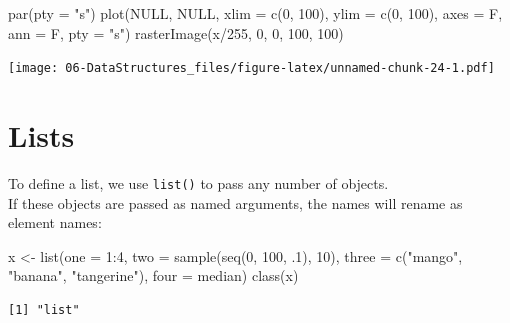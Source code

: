 \documentclass[
]{book}
\newenvironment{Shaded}{\begin{snugshade}}{\end{snugshade}}
\newcommand{\AttributeTok}[1]{\textcolor[rgb]{0.77,0.63,0.00}{#1}}
\newcommand{\ConstantTok}[1]{\textcolor[rgb]{0.00,0.00,0.00}{#1}}
\newcommand{\DecValTok}[1]{\textcolor[rgb]{0.00,0.00,0.81}{#1}}
\newcommand{\FunctionTok}[1]{\textcolor[rgb]{0.00,0.00,0.00}{#1}}
\newcommand{\NormalTok}[1]{#1}
\newcommand{\OtherTok}[1]{\textcolor[rgb]{0.56,0.35,0.01}{#1}}
\newcommand{\SpecialCharTok}[1]{\textcolor[rgb]{0.00,0.00,0.00}{#1}}
\newcommand{\StringTok}[1]{\textcolor[rgb]{0.31,0.60,0.02}{#1}}
\begin{document}
\begin{Shaded}
\begin{Highlighting}[]
\FunctionTok{par}\NormalTok{(}\AttributeTok{pty =} \StringTok{"s"}\NormalTok{)}
\FunctionTok{plot}\NormalTok{(}\ConstantTok{NULL}\NormalTok{, }\ConstantTok{NULL}\NormalTok{,}
     \AttributeTok{xlim =} \FunctionTok{c}\NormalTok{(}\DecValTok{0}\NormalTok{, }\DecValTok{100}\NormalTok{), }\AttributeTok{ylim =} \FunctionTok{c}\NormalTok{(}\DecValTok{0}\NormalTok{, }\DecValTok{100}\NormalTok{),}
     \AttributeTok{axes =}\NormalTok{ F, }\AttributeTok{ann =}\NormalTok{ F, }\AttributeTok{pty =} \StringTok{"s"}\NormalTok{)}
\FunctionTok{rasterImage}\NormalTok{(x}\SpecialCharTok{/}\DecValTok{255}\NormalTok{, }\DecValTok{0}\NormalTok{, }\DecValTok{0}\NormalTok{, }\DecValTok{100}\NormalTok{, }\DecValTok{100}\NormalTok{)}
\end{Highlighting}
\end{Shaded}

\texttt{[image: 06-DataStructures\_files/figure-latex/unnamed-chunk-24-1.pdf]}

\hypertarget{lists}{%
\section{Lists}\label{lists}}

To define a list, we use \texttt{list()} to pass any number of objects.\\
If these objects are passed as named arguments, the names will rename as element names:

\begin{Shaded}
\begin{Highlighting}[]
\NormalTok{x }\OtherTok{\textless{}{-}} \FunctionTok{list}\NormalTok{(}\AttributeTok{one =} \DecValTok{1}\SpecialCharTok{:}\DecValTok{4}\NormalTok{,}
          \AttributeTok{two =} \FunctionTok{sample}\NormalTok{(}\FunctionTok{seq}\NormalTok{(}\DecValTok{0}\NormalTok{, }\DecValTok{100}\NormalTok{, .}\DecValTok{1}\NormalTok{), }\DecValTok{10}\NormalTok{),}
          \AttributeTok{three =} \FunctionTok{c}\NormalTok{(}\StringTok{"mango"}\NormalTok{, }\StringTok{"banana"}\NormalTok{, }\StringTok{"tangerine"}\NormalTok{),}
          \AttributeTok{four =}\NormalTok{ median)}
\FunctionTok{class}\NormalTok{(x)}
\end{Highlighting}
\end{Shaded}

\begin{verbatim}
[1] "list"
\end{verbatim}
\end{document}
